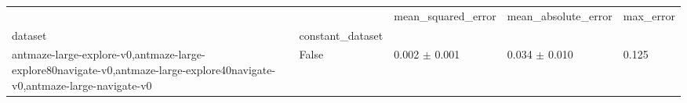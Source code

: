 \begin{tabular}{lllll}
\toprule
 &  & mean_squared_error & mean_absolute_error & max_error \\
dataset & constant_dataset &  &  &  \\
\midrule
antmaze-large-explore-v0,antmaze-large-explore80navigate-v0,antmaze-large-explore40navigate-v0,antmaze-large-navigate-v0 & False & 0.002 $\pm$ 0.001 & 0.034 $\pm$ 0.010 & 0.125 \\
\cline{1-5}
\bottomrule
\end{tabular}
